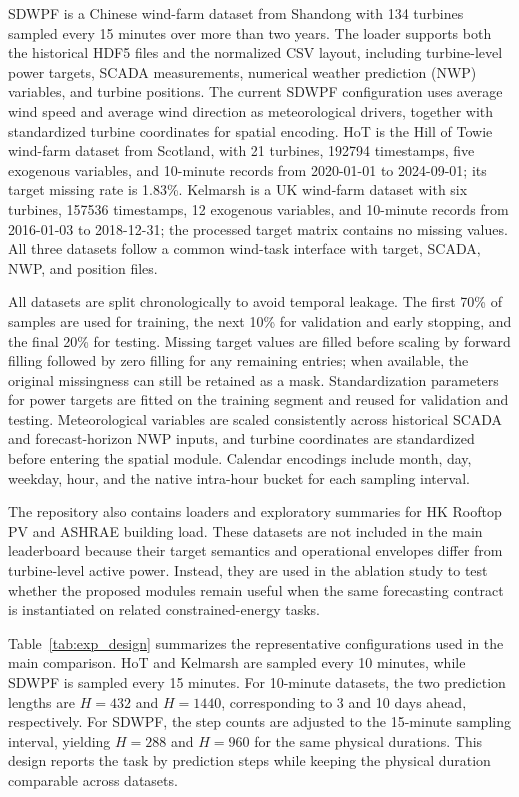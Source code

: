 SDWPF is a Chinese wind-farm dataset from Shandong with 134 turbines sampled every 15 minutes over more than two years. The loader supports both the historical HDF5 files and the normalized CSV layout, including turbine-level power targets, SCADA measurements, numerical weather prediction (NWP) variables, and turbine positions. The current SDWPF configuration uses average wind speed and average wind direction as meteorological drivers, together with standardized turbine coordinates for spatial encoding. HoT is the Hill of Towie wind-farm dataset from Scotland, with 21 turbines, 192794 timestamps, five exogenous variables, and 10-minute records from 2020-01-01 to 2024-09-01; its target missing rate is 1.83\%. Kelmarsh is a UK wind-farm dataset with six turbines, 157536 timestamps, 12 exogenous variables, and 10-minute records from 2016-01-03 to 2018-12-31; the processed target matrix contains no missing values. All three datasets follow a common wind-task interface with target, SCADA, NWP, and position files.

All datasets are split chronologically to avoid temporal leakage. The first 70\% of samples are used for training, the next 10\% for validation and early stopping, and the final 20\% for testing. Missing target values are filled before scaling by forward filling followed by zero filling for any remaining entries; when available, the original missingness can still be retained as a mask. Standardization parameters for power targets are fitted on the training segment and reused for validation and testing. Meteorological variables are scaled consistently across historical SCADA and forecast-horizon NWP inputs, and turbine coordinates are standardized before entering the spatial module. Calendar encodings include month, day, weekday, hour, and the native intra-hour bucket for each sampling interval.

The repository also contains loaders and exploratory summaries for HK Rooftop PV and ASHRAE building load. These datasets are not included in the main leaderboard because their target semantics and operational envelopes differ from turbine-level active power. Instead, they are used in the ablation study to test whether the proposed modules remain useful when the same forecasting contract is instantiated on related constrained-energy tasks.

Table~\ref{tab:exp_design} summarizes the representative configurations used in the main comparison. HoT and Kelmarsh are sampled every 10 minutes, while SDWPF is sampled every 15 minutes. For 10-minute datasets, the two prediction lengths are $H=432$ and $H=1440$, corresponding to 3 and 10 days ahead, respectively. For SDWPF, the step counts are adjusted to the 15-minute sampling interval, yielding $H=288$ and $H=960$ for the same physical durations. This design reports the task by prediction steps while keeping the physical duration comparable across datasets.

